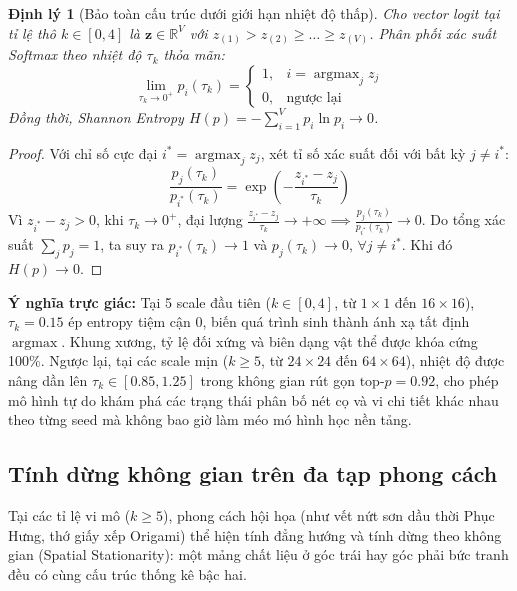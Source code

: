 \documentclass[10pt,twocolumn,letterpaper]{article}
\newtheorem{theorem}{Định lý}
\begin{document}
\begin{theorem}[Bảo toàn cấu trúc dưới giới hạn nhiệt độ thấp]
Cho vector logit tại tỉ lệ thô $k \in [0, 4]$ là $\mathbf{z} \in \mathbb{R}^V$ với $z_{(1)} > z_{(2)} \ge \dots \ge z_{(V)}$. Phân phối xác suất Softmax theo nhiệt độ $\tau_k$ thỏa mãn:
\begin{equation}
\lim_{\tau_k \to 0^+} p_i(\tau_k) = \begin{cases} 1, & i = \operatorname{argmax}_j z_j \\ 0, & \text{ngược lại} \end{cases}
\end{equation}
Đồng thời, Shannon Entropy $H(p) = -\sum_{i=1}^V p_i \ln p_i \to 0$.
\end{theorem}

\begin{proof}
Với chỉ số cực đại $i^* = \operatorname{argmax}_j z_j$, xét tỉ số xác suất đối với bất kỳ $j \ne i^*$:
\begin{equation}
\frac{p_j(\tau_k)}{p_{i^*}(\tau_k)} = \exp\left(-\frac{z_{i^*} - z_j}{\tau_k}\right)
\end{equation}
Vì $z_{i^*} - z_j > 0$, khi $\tau_k \to 0^+$, đại lượng $\frac{z_{i^*} - z_j}{\tau_k} \to +\infty \implies \frac{p_j(\tau_k)}{p_{i^*}(\tau_k)} \to 0$. Do tổng xác suất $\sum_j p_j = 1$, ta suy ra $p_{i^*}(\tau_k) \to 1$ và $p_j(\tau_k) \to 0, \, \forall j \ne i^*$. Khi đó $H(p) \to 0$.
\end{proof}

\noindent
\textbf{Ý nghĩa trực giác:} Tại 5 scale đầu tiên ($k \in [0, 4]$, từ $1 \times 1$ đến $16 \times 16$), $\tau_k = 0.15$ ép entropy tiệm cận $0$, biến quá trình sinh thành ánh xạ tất định $\operatorname{argmax}$. Khung xương, tỷ lệ đối xứng và biên dạng vật thể được khóa cứng 100\%. Ngược lại, tại các scale mịn ($k \ge 5$, từ $24 \times 24$ đến $64 \times 64$), nhiệt độ được nâng dần lên $\tau_k \in [0.85, 1.25]$ trong không gian rút gọn $\text{top-}p = 0.92$, cho phép mô hình tự do khám phá các trạng thái phân bố nét cọ và vi chi tiết khác nhau theo từng seed mà không bao giờ làm méo mó hình học nền tảng.

\subsection{Tính dừng không gian trên đa tạp phong cách}
Tại các tỉ lệ vi mô ($k \ge 5$), phong cách hội họa (như vết nứt sơn dầu thời Phục Hưng, thớ giấy xếp Origami) thể hiện tính đẳng hướng và tính dừng theo không gian (Spatial Stationarity): một mảng chất liệu ở góc trái hay góc phải bức tranh đều có cùng cấu trúc thống kê bậc hai.
\end{document}
